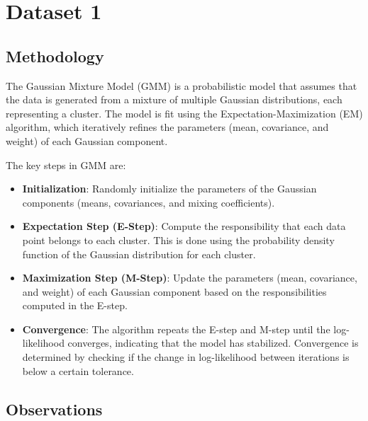 \documentclass[conference]{IEEEtran}
\begin{document}
	
	\section{Dataset 1}
	
	\subsection{Methodology}
	The Gaussian Mixture Model (GMM) is a probabilistic model that assumes that the data is generated from a mixture of multiple Gaussian distributions, each representing a cluster. The model is fit using the Expectation-Maximization (EM) algorithm, which iteratively refines the parameters (mean, covariance, and weight) of each Gaussian component.
	
	The key steps in GMM are:
	
	\begin{itemize}
		\item \textbf{Initialization}: Randomly initialize the parameters of the Gaussian components (means, covariances, and mixing coefficients).
		\item \textbf{Expectation Step (E-Step)}: Compute the responsibility that each data point belongs to each cluster. This is done using the probability density function of the Gaussian distribution for each cluster.
		\item \textbf{Maximization Step (M-Step)}: Update the parameters (mean, covariance, and weight) of each Gaussian component based on the responsibilities computed in the E-step.
		\item \textbf{Convergence}: The algorithm repeats the E-step and M-step until the log-likelihood converges, indicating that the model has stabilized. Convergence is determined by checking if the change in log-likelihood between iterations is below a certain tolerance.
	\end{itemize}
	
	\subsection{Observations}
	
\end{document}

